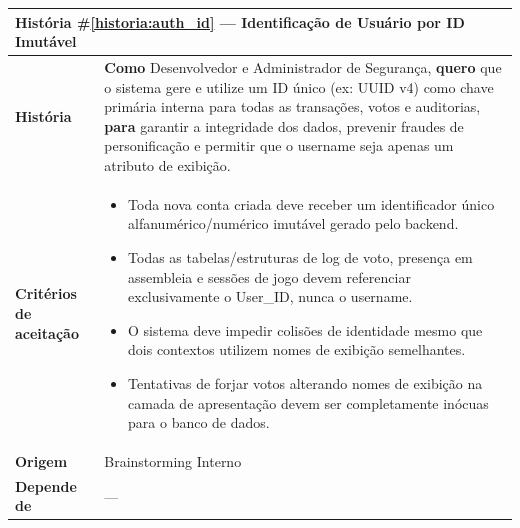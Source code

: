 \documentclass[12pt,a4paper]{article}
\newcounter{historia}
\begin{document}
\label{historia:auth_id}
\begin{table}[H]
    \centering
    \begin{tabular}{|m{4.5cm} | m{11cm}|}
    \hline
    
    \multicolumn{2}{|l|}{\textbf{História \#\ref{historia:auth_id} --- Identificação de Usuário por ID Imutável}} \\
    
    \hline  \textbf{História} &
    \textbf{Como} Desenvolvedor e Administrador de Segurança, \newline
    \textbf{quero} que o sistema gere e utilize um ID único (ex: UUID v4) como chave primária interna para todas as transações, votos e auditorias, \newline  
    \textbf{para} garantir a integridade dos dados, prevenir fraudes de personificação e permitir que o username seja apenas um atributo de exibição. \\
    
    \textbf{Critérios de aceitação} &
    \begin{itemize}
        \item{Toda nova conta criada deve receber um identificador único alfanumérico/numérico imutável gerado pelo backend.}
        \item{Todas as tabelas/estruturas de log de voto, presença em assembleia e sessões de jogo devem referenciar exclusivamente o User\_ID, nunca o username.}
        \item{O sistema deve impedir colisões de identidade mesmo que dois contextos utilizem nomes de exibição semelhantes.}
        \item{Tentativas de forjar votos alterando nomes de exibição na camada de apresentação devem ser completamente inócuas para o banco de dados.}
    \end{itemize}\\
    
    \textbf{Origem} &
    Brainstorming Interno \\
    
    \textbf{Depende de} &
    --- \\
    \hline
    \end{tabular}
\end{table}
\end{document}

